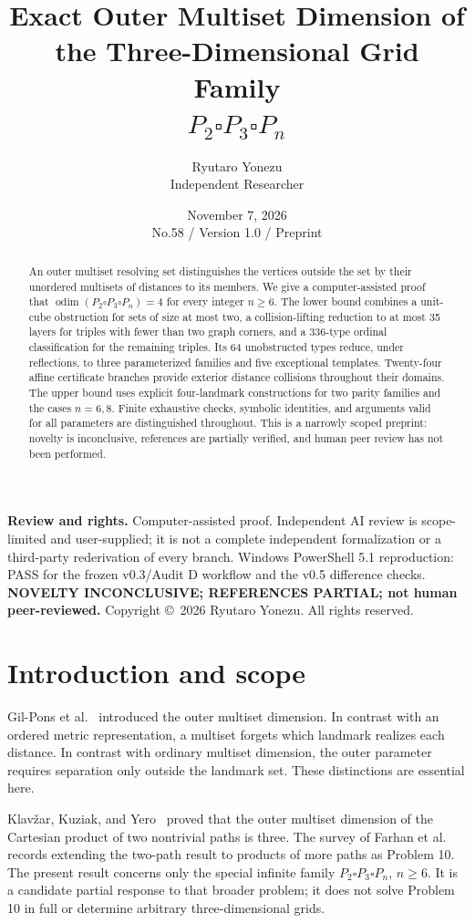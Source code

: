 \documentclass[11pt,a4paper]{article}
\title{Exact Outer Multiset Dimension of the Three-Dimensional Grid Family\texorpdfstring{\\$P_2\square P_3\square P_n$}{ P2 square P3 square Pn}}
\author{Ryutaro Yonezu\\\small Independent Researcher}
\date{November 7, 2026\\\small No.58 / Version 1.0 / Preprint}
\newcommand{\odim}{\operatorname{odim}}
\begin{document}
\maketitle
\begin{abstract}
An outer multiset resolving set distinguishes the vertices outside the set by their unordered multisets of distances to its members. We give a computer-assisted proof that $\odim(P_2\square P_3\square P_n)=4$ for every integer $n\ge6$. The lower bound combines a unit-cube obstruction for sets of size at most two, a collision-lifting reduction to at most 35 layers for triples with fewer than two graph corners, and a 336-type ordinal classification for the remaining triples. Its 64 unobstructed types reduce, under reflections, to three parameterized families and five exceptional templates. Twenty-four affine certificate branches provide exterior distance collisions throughout their domains. The upper bound uses explicit four-landmark constructions for two parity families and the cases $n=6,8$. Finite exhaustive checks, symbolic identities, and arguments valid for all parameters are distinguished throughout. This is a narrowly scoped preprint: novelty is inconclusive, references are partially verified, and human peer review has not been performed.
\end{abstract}
\noindent\textbf{Review and rights.} Computer-assisted proof. Independent AI review is scope-limited and user-supplied; it is not a complete independent formalization or a third-party rederivation of every branch. Windows PowerShell 5.1 reproduction: PASS for the frozen v0.3/Audit D workflow and the v0.5 difference checks. \textbf{NOVELTY INCONCLUSIVE; REFERENCES PARTIAL; not human peer-reviewed.} Copyright \copyright\ 2026 Ryutaro Yonezu. All rights reserved.

\section{Introduction and scope}
Gil-Pons et al.~\cite{gil} introduced the outer multiset dimension. In contrast with an ordered metric representation, a multiset forgets which landmark realizes each distance. In contrast with ordinary multiset dimension, the outer parameter requires separation only outside the landmark set. These distinctions are essential here.

Klav\v zar, Kuziak, and Yero~\cite{kky} proved that the outer multiset dimension of the Cartesian product of two nontrivial paths is three. The survey of Farhan et al.~\cite{survey} records extending the two-path result to products of more paths as Problem 10. The present result concerns only the special infinite family $P_2\square P_3\square P_n$, $n\ge6$. It is a candidate partial response to that broader problem; it does not solve Problem 10 in full or determine arbitrary three-dimensional grids.
\end{document}
